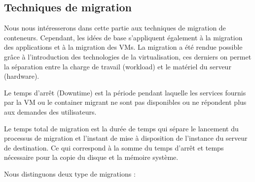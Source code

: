 \subsection{Techniques de migration}
Nous nous intéresserons dans cette partie aux techniques de migration de conteneurs. Cependant, les idées de base s'appliquent également à la migration des applications et à la migration des VMs. La migration a été rendue possible grâce à l'introduction des technologies de la virtualisation, ces derniers on permet la séparation entre la charge de travail (workload) et le matériel du serveur (hardware).\par
Le temps d'arrêt (Downtime) est la période pendant laquelle les services fournis par la VM ou le container migrant ne sont pas disponibles ou ne répondent plus aux demandes des utilisateurs.\par
Le temps total de migration est la durée de temps qui sépare le lancement du processus de migration et l'instant de mise à disposition de l'instance du serveur de destination. Ce qui correspond à la somme du temps d'arrêt et temps nécessaire pour la copie du disque et la mémoire système.\par
Nous distinguons deux type de migrations \cite{puliafito2019}:
